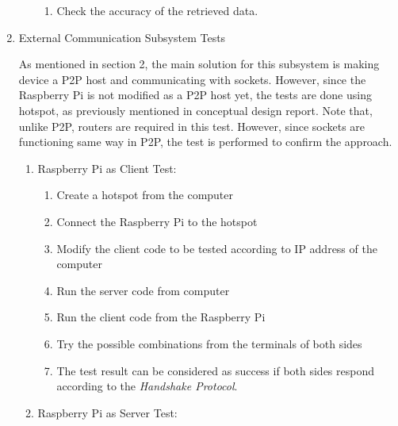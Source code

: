 \documentclass[a4paper,12pt]{article}
\begin{document}
\begin{enumerate}
\begin{enumerate}
\begin{enumerate}
\item Check the accuracy of the retrieved data. 

\end{enumerate}

\end{enumerate}





\item {External Communication Subsystem Tests}


As mentioned in section 2, the main solution for this subsystem is making device a P2P host and communicating with sockets. However, since the Raspberry Pi is not modified as a P2P host yet, the tests are done using hotspot, as previously mentioned in conceptual design report. Note that, unlike P2P, routers are required in this test. However, since sockets are functioning same way in P2P, the test is performed to confirm the approach.

\begin{enumerate}


\item Raspberry Pi as Client Test:


\begin{enumerate}

\item Create a hotspot from the computer  

\item Connect the Raspberry Pi to the hotspot  

\item Modify the client code to be tested according to IP address of the computer

\item Run the server code from computer  

\item Run the client code from the Raspberry Pi  

\item Try the possible combinations from the terminals of both sides  

\item The test result can be considered as success if both sides respond according to the \textit{Handshake Protocol}.

\end{enumerate}		


\item Raspberry Pi as Server Test:



\end{enumerate}
\end{enumerate}
\end{document}
